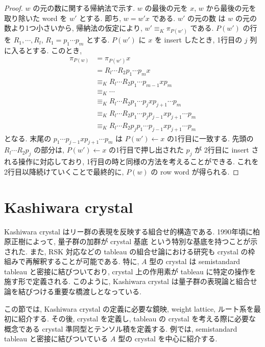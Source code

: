 \documentclass[
  a4paper, 
  12pt,
  ja=standard,
  xelatex,
  left=30truemm,
  right=30truemm,
  titlepage 
]{bxjsarticle}
\theoremstyle{definition}
\begin{document}
\begin{proof}
  $w$ の元の数に関する帰納法で示す.
  $w$ の最後の元を $x$, $w$ から最後の元を取り除いた word を $w'$ とする.
  即ち, $w = w'x$ である.
  $w'$ の元の数 は $w$ の元の数より1つ小さいから, 帰納法の仮定により,
  $w' \equiv_{K} \pi_{P(w')}$ である.
  $P(w')$ の行を $R_1, \cdots, R_l$, $R_1 = p_1 \cdots p_m$ とする.
  $P(w')$ に $x$ を insert したとき, 1行目の $j$ 列に入るとする.
  このとき,
  \begin{align*}
    \pi_{P(w)} 
    &= \pi_{{P(w')}} x \\
    &= R_l \cdots R_2 p_1 \cdots p_m x \\
    &\equiv_{K} R_l \cdots R_2 p_1 \cdots p_{m - 1} x p_m \\
    &\equiv_{K} \cdots \\
    &\equiv_{K} R_l \cdots R_2 p_1 \cdots p_j x p_{j + 1} \cdots p_m \\
    &\equiv_{K} R_l \cdots R_2 p_1 \cdots p_j p_{j - 1} x p_{j + 1} \cdots p_m \\
    &\equiv_{K} R_l \cdots R_2 p_j p_1 \cdots p_{j - 1} x p_{j + 1} \cdots p_m
  \end{align*}
  となる.
  末尾の $p_1 \cdots p_{j - 1} x p_{j + 1} \cdots p_m$ は
  $P(w') \leftarrow x$ の1行目に一致する.
  先頭の $R_l \cdots R_2 p_j$ の部分は, $P(w') \leftarrow x$ の1行目で押し出された $p_j$ が
  2行目に insert される操作に対応しており, 1行目の時と同様の方法を考えることができる.
  これを2行目以降続けていくことで最終的に, $P(w)$ の row word が得られる.
\end{proof}

\section{Kashiwara crystal}
Kashiwara crystal はリー群の表現を反映する組合せ的構造である.
1990年頃に柏原正樹によって, 量子群の加群が crystal 基底 という特別な基底を持つことが示された.
また, RSK 対応などの tableau の組合せ論における研究も crystal の枠組みで再解釈することが可能である.
特に, $A$ 型の crystal は semistandard tableau と密接に結びついており, 
crystal 上の作用素が tableau に特定の操作を施す形で定義される.
このように, Kashiwara crystal は量子群の表現論と組合せ論を結びつける重要な橋渡しとなっている.

この節では, Kashiwara crystal の定義に必要な鏡映, weight lattice, ルート系を最初に紹介する.
その後, crystal を定義し, tableau の crystal を考える際に必要な概念である crystal 準同型とテンソル積を定義する.
例では, semistandard tableau と密接に結びついている $A$ 型の crystal を中心に紹介する.
\end{document}
